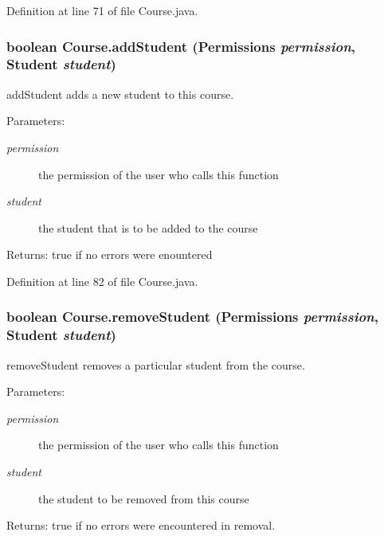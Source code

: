 Definition at line 71 of file Course.java.\hypertarget{classCourse_5b9c0561583f36cd8ad5d04712d19c82}{
\subsubsection{\setlength{\rightskip}{0pt plus 5cm}boolean Course.addStudent ({\bf Permissions} {\em permission}, \/  {\bf Student} {\em student})}}
\label{classCourse_5b9c0561583f36cd8ad5d04712d19c82}


addStudent adds a new student to this course. 

\begin{Desc}
\item[Parameters:]
\begin{description}
\item[{\em permission}]the permission of the user who calls this function \item[{\em student}]the student that is to be added to the course \end{description}
\end{Desc}
\begin{Desc}
\item[Returns:]true if no errors were enountered \end{Desc}


Definition at line 82 of file Course.java.\hypertarget{classCourse_1ef5ef0c45209e94bc4c80e679a05ccd}{
\subsubsection{\setlength{\rightskip}{0pt plus 5cm}boolean Course.removeStudent ({\bf Permissions} {\em permission}, \/  {\bf Student} {\em student})}}
\label{classCourse_1ef5ef0c45209e94bc4c80e679a05ccd}


removeStudent removes a particular student from the course. 

\begin{Desc}
\item[Parameters:]
\begin{description}
\item[{\em permission}]the permission of the user who calls this function \item[{\em student}]the student to be removed from this course \end{description}
\end{Desc}
\begin{Desc}
\item[Returns:]true if no errors were encountered in removal. \end{Desc}



